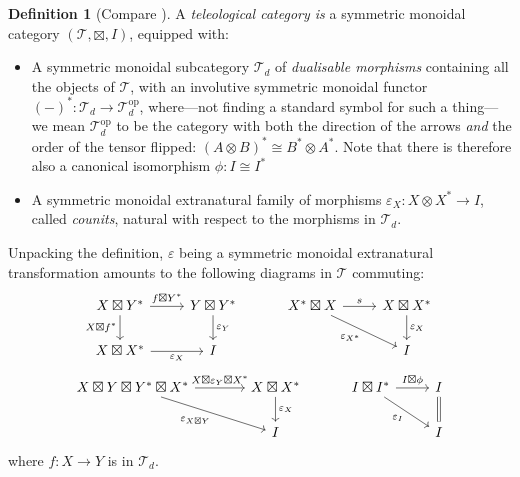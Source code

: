 \documentclass[11pt,letterpaper]{article}
\theoremstyle{plain}
\theoremstyle{definition}
\newtheorem{definition}[theorem]{Definition}
\newcommand{\T}{\mathscr{T}}
\newcommand{\op}{\mathrm{op}}
\newcommand{\teletimes}{\mathbin{\boxtimes}}
\begin{document}
\begin{definition}[Compare {\cite[Definition 5.1]{CoherenceForLenses}}]
  A \emph{teleological category is} a symmetric monoidal category $(\T, \teletimes, I)$, equipped with:
  \begin{itemize}
  \item A symmetric monoidal subcategory $\T_d$ of \emph{dualisable morphisms} containing all the objects of $\T$, with an involutive symmetric monoidal functor ${(-)}^* : \T_d \to \T_d^\op$, where---not finding a standard symbol for such a thing---we mean $\T_d^\op$ to be the category with both the direction of the arrows \emph{and} the order of the tensor flipped: ${(A \otimes B)}^* \cong B^* \otimes A^*$. Note that there is therefore also a canonical isomorphism $\phi : I \cong I^*$
  \item A symmetric monoidal extranatural family of morphisms $\varepsilon_X : X \otimes X^* \to I$, called \emph{counits}, natural with respect to the morphisms in $\T_d$.
  \end{itemize}
\end{definition}
Unpacking the definition, $\varepsilon$ being a symmetric monoidal extranatural transformation amounts to the following diagrams in $\T$ commuting:
\[
  \begin{tikzcd}
    X \teletimes Y^* \ar[r, "f \teletimes Y^*"]  \ar[d, "X \teletimes f^*", swap] & Y \teletimes Y^* \ar[d, "\varepsilon_Y"] \\
    X \teletimes X^* \ar[r, "\varepsilon_X", swap] & I
  \end{tikzcd} \hspace{1cm}
  \begin{tikzcd}
    X^* \teletimes X \ar[r, "s"]  \ar[dr, "\varepsilon_{X^*}", swap] & X \teletimes X^* \ar[d, "\varepsilon_X"] \\
    & I
  \end{tikzcd}\]
\[
  \begin{tikzcd}[column sep = large]
    X \teletimes Y \teletimes Y^* \teletimes X^* \ar[r, "X \teletimes \varepsilon_Y \teletimes X^*"]  \ar[dr, "\varepsilon_{X \teletimes Y}", swap] & X \teletimes X^* \ar[d, "\varepsilon_X"] \\
    & I
  \end{tikzcd} \hspace{1cm}
  \begin{tikzcd}
    I \teletimes I^* \ar[r,"I \teletimes \phi"] \ar[dr, swap, "\varepsilon_I"] & I \ar[d, equal] \\
    & I
  \end{tikzcd}
\]
where $f : X \to Y$ is in $\T_d$.
\end{document}
